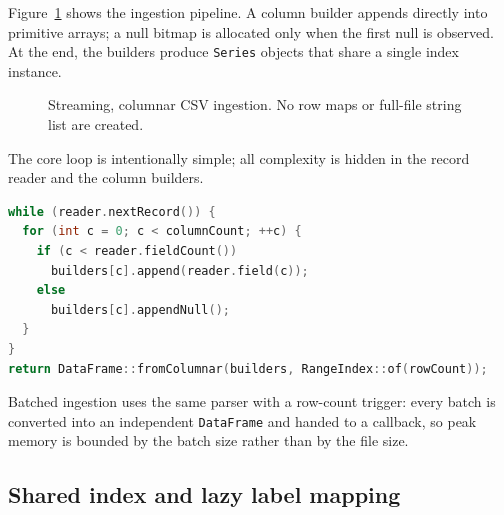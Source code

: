\documentclass[11pt,a4paper]{article}
\newcommand{\code}[1]{\texttt{#1}}
\begin{document}
Figure~\ref{fig:pipeline} shows the ingestion pipeline.  A column builder appends directly into
primitive arrays; a null bitmap is allocated only when the first null is observed.  At the end,
the builders produce \code{Series} objects that share a single index instance.

\begin{figure}[H]
\centering
{}
\caption{Streaming, columnar CSV ingestion.  No row maps or full-file string list are created.}
\label{fig:pipeline}
\end{figure}

The core loop is intentionally simple; all complexity is hidden in the record reader and the
column builders.

\begin{lstlisting}[language=C++]
while (reader.nextRecord()) {
  for (int c = 0; c < columnCount; ++c) {
    if (c < reader.fieldCount())
      builders[c].append(reader.field(c));
    else
      builders[c].appendNull();
  }
}
return DataFrame::fromColumnar(builders, RangeIndex::of(rowCount));
\end{lstlisting}

Batched ingestion uses the same parser with a row-count trigger: every batch is converted into an
independent \code{DataFrame} and handed to a callback, so peak memory is bounded by the batch size
rather than by the file size.

\subsection{Shared index and lazy label mapping}
\end{document}
